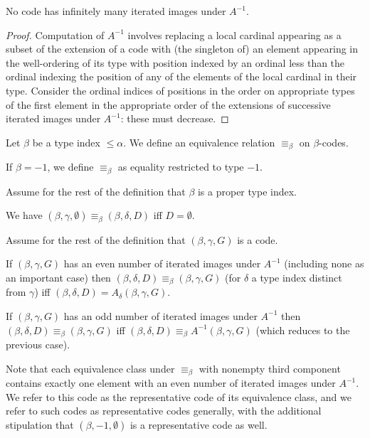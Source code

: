 \begin{lemma}
\label {lem:ainverse-stops}
No code has infinitely many iterated images under $A^{-1}$.
\end{lemma}

\begin{proof}
Computation of $A^{-1}$ involves replacing a local cardinal appearing as a subset of the extension of a code
with (the singleton of) an element appearing in the well-ordering of its type with position indexed by an ordinal
less than the ordinal indexing the position of any of the elements of the local cardinal in their type.  Consider the ordinal indices of positions in the order on appropriate types of the first element in the appropriate order of the extensions of successive iterated images under $A^{-1}$:  these must decrease.
\end{proof}

\begin{definition}
\label {def:equiv-code}
Let $\beta$ be a type index $\leq \alpha$.  We define an equivalence relation $\equiv_\beta$ on $\beta$-codes.

If $\beta=-1$, we define $\equiv_\beta$ as equality restricted to type $-1$.

Assume for the rest of the definition that $\beta$ is a proper type index.

We have $(\beta,\gamma,\emptyset) \equiv_\beta (\beta,\delta,D)$ iff $D=\emptyset$.

Assume for the rest of the definition that $(\beta,\gamma,G)$ is a code.

If $(\beta,\gamma,G)$ has an even number of iterated images under $A^{-1}$ (including none as an important case)
then $(\beta,\delta,D) \equiv_\beta (\beta,\gamma,G)$ (for $\delta$ a type index distinct from $\gamma$) iff
$(\beta,\delta,D) = A_\delta(\beta,\gamma,G)$.

If $(\beta,\gamma,G)$ has an odd number of iterated images under $A^{-1}$ then $(\beta,\delta,D) \equiv_\beta (\beta,\gamma,G)$ iff $(\beta,\delta,D) \equiv_\beta A^{-1}(\beta,\gamma,G)$ (which reduces to the previous case).
\end{definition}

\begin{definition}
\label {def:representative-code}
Note that each equivalence class under $\equiv_\beta$ with nonempty third component contains exactly one element with an even number of iterated images under $A^{-1}$.  We refer to this code as the representative code of its equivalence class, and we refer to such codes as representative codes generally, with the additional stipulation that $(\beta,-1,\emptyset)$ is a representative code as well.
\end{definition}

